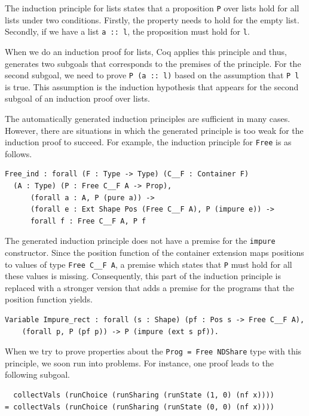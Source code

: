 \documentclass[a4paper, 11pt, fleqn, twoside]{scrreprt}
\newcommand{\cinl}[1]{\texttt{#1}}
\begin{document}
The induction principle for lists states that a proposition \cinl{P} over lists hold for all lists under two conditions.
Firstly, the property needs to hold for the empty list.
Secondly, if we have a list \cinl{a :: l}, the proposition must hold for \cinl{l}.

When we do an induction proof for lists, Coq applies this principle and thus, generates two subgoals that corresponds to the premises of the principle.
For the second subgoal, we need to prove \cinl{P (a :: l)} based on the assumption that \cinl{P l} is true.
This assumption is the induction hypothesis that appears for the second subgoal of an induction proof over lists.

The automatically generated induction principles are sufficient in many cases.
However, there are situations in which the generated principle is too weak for the induction proof to succeed.
For example, the induction principle for \cinl{Free} is as follows.

\begin{verbatim}
Free_ind : forall (F : Type -> Type) (C__F : Container F) 
  (A : Type) (P : Free C__F A -> Prop),
      (forall a : A, P (pure a)) -> 
      (forall e : Ext Shape Pos (Free C__F A), P (impure e)) -> 
      forall f : Free C__F A, P f
\end{verbatim}

The generated induction principle does not have a premise for the \cinl{impure} constructor.
Since the position function of the container extension maps positions to values of type \cinl{Free C__F A}, a premise which states that \cinl{P} must hold for all these values is missing.
Consequently, this part of the induction principle is replaced with a stronger version that adds a premise for the programs that the position function yields.

\begin{verbatim}
Variable Impure_rect : forall (s : Shape) (pf : Pos s -> Free C__F A),
    (forall p, P (pf p)) -> P (impure (ext s pf)).
\end{verbatim}

When we try to prove properties about the \cinl{Prog = Free NDShare} type with this principle, we soon run into problems.
For instance, one proof leads to the following subgoal.

\begin{verbatim}
  collectVals (runChoice (runSharing (runState (1, 0) (nf x))))
= collectVals (runChoice (runSharing (runState (0, 0) (nf x))))
\end{verbatim}
\end{document}
